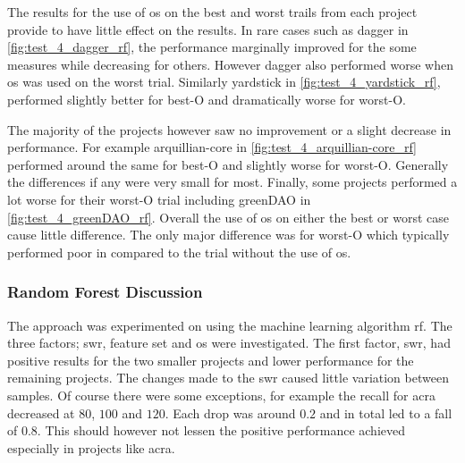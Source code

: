 The results for the use of \gls{os} on the best and worst trails from each project provide to have little effect on the results. In rare cases such as dagger in \autoref{fig:test_4_dagger_rf}, the performance marginally improved for the some measures while decreasing for others. However dagger also performed worse when \gls{os} was used on the worst trial. Similarly yardstick in \autoref{fig:test_4_yardstick_rf}, performed slightly better for best-O and dramatically worse for worst-O.

The majority of the projects however saw no improvement or a slight decrease in performance. For example arquillian-core in \autoref{fig:test_4_arquillian-core_rf} performed around the same for best-O and slightly worse for worst-O. Generally the differences if any were very small for most. Finally, some projects performed a lot worse for their worst-O trial including greenDAO in \autoref{fig:test_4_greenDAO_rf}. Overall the use of \gls{os} on either the best or worst case cause little difference. The only major difference was for worst-O which typically performed poor in compared to the trial without the use of \gls{os}.

\subsubsection{Random Forest Discussion}
\label{subsec:rf_discussion}

The approach was experimented on using the machine learning algorithm \gls{rf}. The three factors; \gls{swr}, feature set and \gls{os} were investigated. The first factor, \gls{swr}, had positive results for the two smaller projects and lower performance for the remaining projects. The changes made to the \gls{swr} caused little variation between samples. Of course there were some exceptions, for example the recall for acra decreased at $80$, $100$ and $120$. Each drop was around $0.2$ and in total led to a fall of $0.8$. This should however not lessen the positive performance achieved especially in projects like acra.

